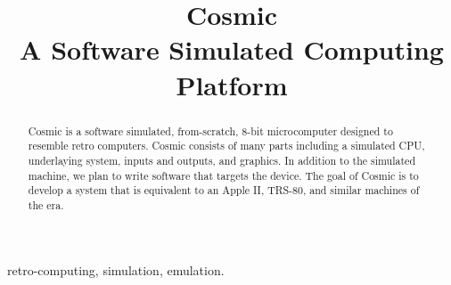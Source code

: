 \documentclass[conference]{IEEEtran}
\begin{document}
\title{
 Cosmic\\A Software Simulated  Computing Platform}

\author{
\and
{}

}

\maketitle

\begin{abstract}
Cosmic is a software simulated, from-scratch, 8-bit microcomputer designed to resemble retro computers. Cosmic consists of many parts including a simulated CPU, underlaying system, inputs and outputs, and graphics. In addition to the simulated machine, we plan to write software that targets the device. The goal of Cosmic is to develop a system that is equivalent to an Apple II, TRS-80, and similar machines of the era.
\end{abstract}

\begin{IEEEkeywords}
retro-computing, simulation, emulation.
\end{IEEEkeywords}
\end{document}
